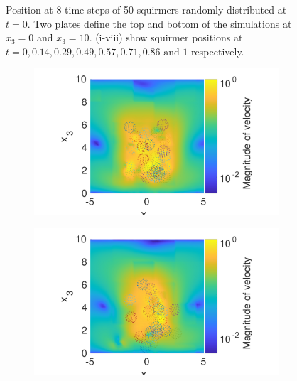 \begin{figure}
\begin{subfigure}[b]{0.2\textwidth}
    \caption[]{\label{fig:squirmerPosH}}
\end{subfigure}
\label{fig:SquiremerGyroPo}
\caption[Position at 8 time steps of 50 squirmers randomly distributed at t=0.]{Position at 8 time steps of 50 squirmers randomly distributed at $t=0$. Two plates define the top and bottom of the simulations at $x_3 = 0$ and  $x_3 = 10$. (i-viii) show squirmer positions at $t = 0, 0.14, 0.29, 0.49, 0.57, 0.71, 0.86 \text{ and } 1$ respectively.}
\end{figure}

\begin{figure}
\centering
\begin{subfigure}[b]{0.42\textwidth}
    \centering
    \includegraphics[width=\textwidth]{Images/squirmers/Gyro-1.pdf}
    \caption[]{\label{fig:squirmerA}}
\end{subfigure}
\begin{subfigure}[b]{0.42\textwidth}
    \centering
    \includegraphics[width=\textwidth]{Images/squirmers/Gyro-2.pdf}
    \caption[]{\label{fig:squirmerB}}

\end{subfigure}
\end{figure}

